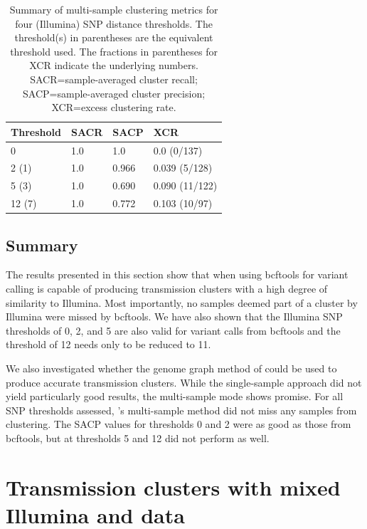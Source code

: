 \begin{table}
\centering
\begin{tabular}{llll}
Threshold & SACR  & SACP  & XCR            \\
\hline
0        & 1.0 & 1.0 & 0.0 (0/137) \\
\hline
2 (1)    & 1.0 & 0.966 & 0.039 (5/128) \\
\hline
5 (3)    & 1.0 & 0.690 & 0.090 (11/122) \\
\hline
12 (7)   & 1.0 & 0.772 & 0.103 (10/97)  
\end{tabular}
\caption{Summary of \pandora{} multi-sample clustering metrics for four (Illumina) SNP distance thresholds. The threshold(s) in parentheses are the \ont{} equivalent threshold used. The fractions in parentheses for XCR indicate the underlying numbers. SACR=sample-averaged cluster recall; SACP=sample-averaged cluster precision; XCR=excess clustering rate.}
\label{tab:compare-cluster-summary}
\end{table}

\subsection{Summary}
\label{sec:cluster-summary}

The results presented in this section show that when using bcftools for variant calling \ont{} is capable of producing transmission clusters with a high degree of similarity to Illumina. Most importantly, no samples deemed part of a cluster by Illumina were missed by bcftools. We have also shown that the Illumina SNP thresholds of 0, 2, and 5 are also valid for \ont{} variant calls from bcftools and the threshold of 12 needs only to be reduced to 11. 

We also investigated whether the genome graph method of \pandora{} could be used to produce accurate transmission clusters. While the single-sample approach did not yield particularly good results, the multi-sample mode shows promise. For all SNP thresholds assessed, \pandora{}'s multi-sample method did not miss any samples from clustering. The SACP values for thresholds 0 and 2 were as good as those from bcftools, but at thresholds 5 and 12 \pandora{} did not perform as well. 


\section{Transmission clusters with mixed Illumina and \ont{} data}

